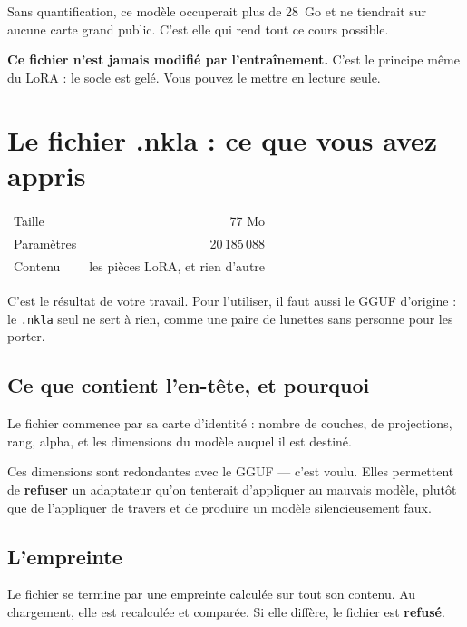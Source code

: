\begin{nkretenir}
Sans quantification, ce modèle occuperait plus de 28~Go et ne tiendrait sur
aucune carte grand public. C'est elle qui rend tout ce cours possible.
\end{nkretenir}

\textbf{Ce fichier n'est jamais modifié par l'entraînement.} C'est le principe
même du LoRA : le socle est gelé. Vous pouvez le mettre en lecture seule.

\section{Le fichier .nkla : ce que vous avez appris}

\begin{center}
\begin{tabular}{lr}
\toprule
Taille & 77 Mo \\
Paramètres & 20\,185\,088 \\
Contenu & les pièces LoRA, et rien d'autre \\
\bottomrule
\end{tabular}
\end{center}

C'est le résultat de votre travail. Pour l'utiliser, il faut aussi le GGUF
d'origine : le \texttt{.nkla} seul ne sert à rien, comme une paire de lunettes
sans personne pour les porter.

\subsection{Ce que contient l'en-tête, et pourquoi}

Le fichier commence par sa carte d'identité : nombre de couches, de projections,
rang, alpha, et les dimensions du modèle auquel il est destiné.

Ces dimensions sont redondantes avec le GGUF — c'est voulu. Elles permettent de
\textbf{refuser} un adaptateur qu'on tenterait d'appliquer au mauvais modèle,
plutôt que de l'appliquer de travers et de produire un modèle silencieusement
faux.

\subsection{L'empreinte}

Le fichier se termine par une empreinte calculée sur tout son contenu. Au
chargement, elle est recalculée et comparée. Si elle diffère, le fichier est
\textbf{refusé}.

